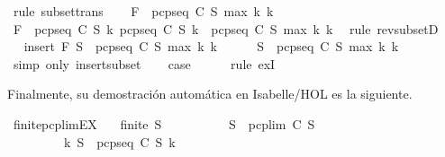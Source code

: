 \begin{isabellebody}
\ {\isacharparenleft}rule\ subset{\isacharunderscore}trans{\isacharparenright}\isanewline
\ \ \isamarkupfalse%
\ {\isachardoublequoteopen}F\ {\isasymin}\ pcp{\isacharunderscore}seq\ C\ S\ {\isacharparenleft}max\ k{}\ k{}{\isacharparenright}{\isachardoublequoteclose}\isanewline
\ \ \ \ \isamarkupfalse%
\ {\isacartoucheopen}F\ {\isasymin}\ pcp{\isacharunderscore}seq\ C\ S\ k{}{\isacartoucheclose}\ {\isacartoucheopen}pcp{\isacharunderscore}seq\ C\ S\ k{}\ {\isasymsubseteq}\ pcp{\isacharunderscore}seq\ C\ S\ {\isacharparenleft}max\ k{}\ k{}{\isacharparenright}{\isacartoucheclose}\ \isamarkupfalse%
\ {\isacharparenleft}rule\ rev{\isacharunderscore}subsetD{\isacharparenright}\isanewline
\ \ \isamarkupfalse%
\ \isamarkupfalse%
\ {}{\isacharcolon}{\isachardoublequoteopen}insert\ F\ S{\isacharprime}\ {\isasymsubseteq}\ pcp{\isacharunderscore}seq\ C\ S\ {\isacharparenleft}max\ k{}\ k{}{\isacharparenright}{\isachardoublequoteclose}\isanewline
\ \ \ \ \isamarkupfalse%
\ {\isacartoucheopen}S{\isacharprime}\ {\isasymsubseteq}\ pcp{\isacharunderscore}seq\ C\ S\ {\isacharparenleft}max\ k{}\ k{}{\isacharparenright}{\isacartoucheclose}\ \isamarkupfalse%
\ {\isacharparenleft}simp\ only{\isacharcolon}\ insert{\isacharunderscore}subset{\isacharparenright}\isanewline
\ \ \isamarkupfalse%
\ {\isacharquery}case\isanewline
\ \ \ \ \isamarkupfalse%
\ {\isacharparenleft}rule\ exI{\isacharparenright}\isanewline
{}\isamarkupfalse%
%
\endisatagproof
{\isafoldproof}%
%
\isadelimproof
%
\endisadelimproof
%
\begin{isamarkuptext}%
Finalmente, su demostración automática en Isabelle/HOL es la siguiente.%
\end{isamarkuptext}\isamarkuptrue%
\isamarkupfalse%
\ finite{\isacharunderscore}pcp{\isacharunderscore}lim{\isacharunderscore}EX{\isacharcolon}\isanewline
\ \ \ {\isachardoublequoteopen}finite\ S{\isacharprime}{\isachardoublequoteclose}\isanewline
\ \ \ \ \ \ \ \ \ \ {\isachardoublequoteopen}S{\isacharprime}\ {\isasymsubseteq}\ pcp{\isacharunderscore}lim\ C\ S{\isachardoublequoteclose}\isanewline
\ \ \ \ \ \ \ \ \ {\isachardoublequoteopen}{\isasymexists}k{\isachardot}\ S{\isacharprime}\ {\isasymsubseteq}\ pcp{\isacharunderscore}seq\ C\ S\ k{\isachardoublequoteclose}\isanewline

\end{isabellebody}

